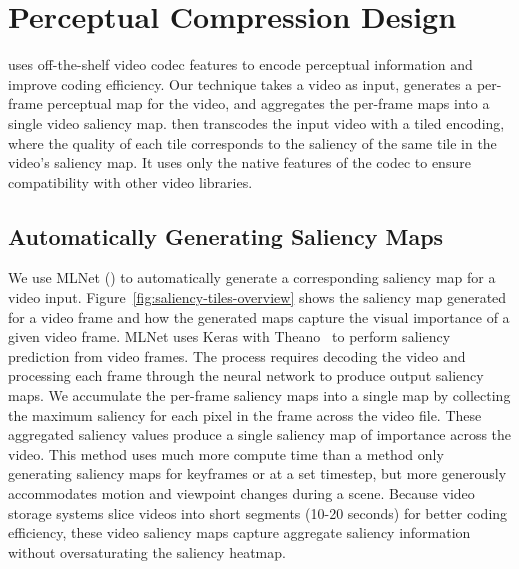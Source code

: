 \section{\name Perceptual Compression Design}
\label{sec:tiled-compression}

\nameCompress uses off-the-shelf video codec features to encode perceptual information and improve coding efficiency.
Our technique takes a video as input, generates a per-frame perceptual map for the video, and aggregates the per-frame maps into a single video saliency map.
\nameCompress then transcodes the input video with a tiled encoding, where the quality of each tile corresponds to the saliency of the same tile in the video's saliency map.
It uses only the native features of the \hevc codec to ensure compatibility with other video libraries.

\subsection{Automatically Generating Saliency Maps}
\label{subsec:supersal}

We use MLNet (\cite{mlnet2016}) to automatically generate a corresponding saliency map for a video input.
Figure~\ref{fig:saliency-tiles-overview} shows the saliency map generated for a video frame and how the generated maps capture the visual importance of a given video frame.
MLNet uses Keras with Theano~\cite{chollet2015keras, theano} to perform saliency prediction from video frames.
The process requires decoding the video and processing each frame through the neural network to produce output saliency maps.
We accumulate the per-frame saliency maps into a single map by collecting the maximum saliency for each pixel in the frame across the video file.
These aggregated saliency values produce a single saliency map of importance across the video.
This method uses much more compute time than a method only generating saliency maps for keyframes or at a set timestep, but more generously accommodates motion and viewpoint changes during a scene.
Because video storage systems slice videos into short segments (10-20 seconds) for better coding efficiency, these video saliency maps capture aggregate saliency information without oversaturating the saliency heatmap.

